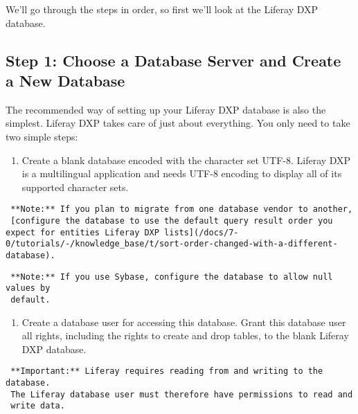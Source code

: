 We'll go through the steps in order, so first we'll look at the Liferay
DXP database.

\subsection{Step 1: Choose a Database Server and Create a New
Database}\label{step-1-choose-a-database-server-and-create-a-new-database}

The recommended way of setting up your Liferay DXP database is also the
simplest. Liferay DXP takes care of just about everything. You only need
to take two simple steps:

\begin{enumerate}
\def\labelenumi{\arabic{enumi}.}
\tightlist
\item
  Create a blank database encoded with the character set UTF-8. Liferay
  DXP is a multilingual application and needs UTF-8 encoding to display
  all of its supported character sets.
\end{enumerate}

\noindent\hrulefill

\begin{verbatim}
 **Note:** If you plan to migrate from one database vendor to another,
 [configure the database to use the default query result order you expect for entities Liferay DXP lists](/docs/7-0/tutorials/-/knowledge_base/t/sort-order-changed-with-a-different-database).
\end{verbatim}

\noindent\hrulefill

\noindent\hrulefill

\begin{verbatim}
 **Note:** If you use Sybase, configure the database to allow null values by
 default.
\end{verbatim}

\noindent\hrulefill

\begin{enumerate}
\def\labelenumi{\arabic{enumi}.}
\setcounter{enumi}{1}
\tightlist
\item
  Create a database user for accessing this database. Grant this
  database user all rights, including the rights to create and drop
  tables, to the blank Liferay DXP database.
\end{enumerate}

\noindent\hrulefill

\begin{verbatim}
 **Important:** Liferay requires reading from and writing to the database.
 The Liferay database user must therefore have permissions to read and
 write data.
\end{verbatim}

